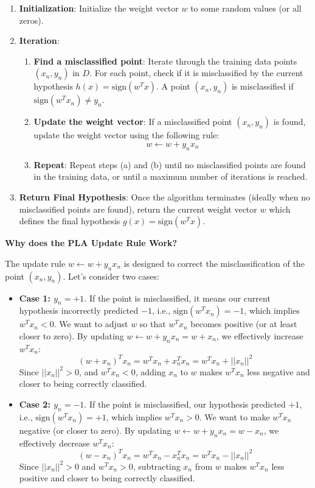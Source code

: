 \documentclass{article}
\begin{document}
\begin{enumerate}
    \item \textbf{Initialization}: Initialize the weight vector \(w\) to some random values (or all zeros).

    \item \textbf{Iteration}:
    \begin{enumerate}
        \item \textbf{Find a misclassified point}: Iterate through the training data points \((x_n, y_n)\) in \(D\).  For each point, check if it is misclassified by the current hypothesis \(h(x) = \text{sign}(w^T x)\). A point \((x_n, y_n)\) is misclassified if \(\text{sign}(w^T x_n) \neq y_n\).
        \item \textbf{Update the weight vector}: If a misclassified point \((x_n, y_n)\) is found, update the weight vector using the following rule:
        \[
        w \leftarrow w + y_n x_n
        \]
        \item \textbf{Repeat}: Repeat steps (a) and (b) until no misclassified points are found in the training data, or until a maximum number of iterations is reached.
    \end{enumerate}

    \item \textbf{Return Final Hypothesis}: Once the algorithm terminates (ideally when no misclassified points are found), return the current weight vector \(w\) which defines the final hypothesis \(g(x) = \text{sign}(w^T x)\).
\end{enumerate}

\textbf{Why does the PLA Update Rule Work?}

The update rule \(w \leftarrow w + y_n x_n\) is designed to correct the misclassification of the point \((x_n, y_n)\).  Let's consider two cases:

\begin{itemize}
    \item \textbf{Case 1: \(y_n = +1\)}.  If the point is misclassified, it means our current hypothesis incorrectly predicted \(-1\), i.e., \(\text{sign}(w^T x_n) = -1\), which implies \(w^T x_n < 0\).  We want to adjust \(w\) so that \(w^T x_n\) becomes positive (or at least closer to zero).  By updating \(w \leftarrow w + y_n x_n = w + x_n\), we effectively increase \(w^T x_n\):
    \[
    (w + x_n)^T x_n = w^T x_n + x_n^T x_n = w^T x_n + ||x_n||^2
    \]
    Since \(||x_n||^2 > 0\), and \(w^T x_n < 0\), adding \(x_n\) to \(w\) makes \(w^T x_n\) less negative and closer to being correctly classified.

    \item \textbf{Case 2: \(y_n = -1\)}. If the point is misclassified, our hypothesis predicted \(+1\), i.e., \(\text{sign}(w^T x_n) = +1\), which implies \(w^T x_n > 0\). We want to make \(w^T x_n\) negative (or closer to zero). By updating \(w \leftarrow w + y_n x_n = w - x_n\), we effectively decrease \(w^T x_n\):
    \[
    (w - x_n)^T x_n = w^T x_n - x_n^T x_n = w^T x_n - ||x_n||^2
    \]
    Since \(||x_n||^2 > 0\) and \(w^T x_n > 0\), subtracting \(x_n\) from \(w\) makes \(w^T x_n\) less positive and closer to being correctly classified.
\end{itemize}
\end{document}
